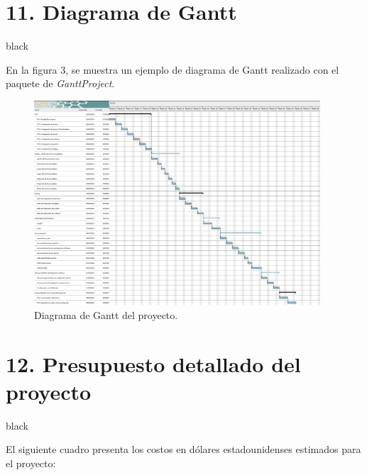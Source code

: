 \documentclass[
11pt, %
]{charter}
\begin{document}
\section{11. Diagrama de Gantt}
\label{sec:gantt}

\begin{consigna}{black}

En la figura 3, se muestra un ejemplo de diagrama de Gantt realizado con el paquete de \textit{GanttProject}. 

\begin{figure}[htpb]
\centering 
\includegraphics[width=0.95\textwidth]{./Figuras/Captura_Robot_Plan.png}
\caption{Diagrama de Gantt del proyecto.}
\label{fig:diagGantt}
\end{figure}
\end{consigna}

\section{12. Presupuesto detallado del proyecto}
\label{sec:presupuesto}

\begin{consigna}{black}

El siguiente cuadro presenta los costos en dólares estadounidenses estimados para el proyecto:

\end{consigna}
\end{document}
